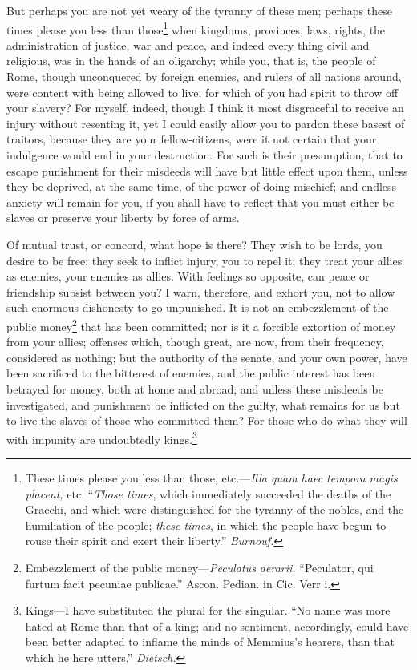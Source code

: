 But perhaps you are not yet weary of the tyranny of these men;
perhaps these times please you less than those\footnote{These times please you less than those, etc.—\emph{Illa quam
haec tempora magis placent,} etc. ``\emph{Those times}, which immediately
succeeded the deaths of the Gracchi, and which were distinguished for
the tyranny of the nobles, and the humiliation of the people; \emph{these
times}, in which the people have begun to rouse their spirit and exert
their liberty.'' \emph{Burnouf.}} when kingdoms,
provinces, laws, rights, the administration of justice, war and peace,
and indeed every thing civil and religious, was in the hands of an
oligarchy; while you, that is, the people of Rome, though unconquered
by foreign enemies, and rulers of all nations around, were content
with being allowed to live; for which of you had spirit to throw off
your slavery? For myself, indeed, though I think it most disgraceful
to receive an injury without resenting it, yet I could easily allow
you to pardon these basest of traitors, because they are your
fellow-citizens, were it not certain that your indulgence would end in
your destruction. For such is their presumption, that to escape
punishment for their misdeeds will have but little effect upon them,
unless they be deprived, at the same time, of the power of doing
mischief; and endless anxiety will remain for you, if you shall have
to reflect that you must either be slaves or preserve your liberty by
force of arms.

Of mutual trust, or concord, what hope is there? They wish to be
lords, you desire to be free; they seek to inflict injury, you to
repel it; they treat your allies as enemies, your enemies as allies.
With feelings so opposite, can peace or friendship subsist between
you? I warn, therefore, and exhort you, not to allow such enormous
dishonesty to go unpunished. It is not an embezzlement of the public
money\footnote{Embezzlement of the public money—\emph{Peculatus aerarii.} ``Peculator,
qui furtum facit pecuniae publicae.'' Ascon. Pedian. in Cic. Verr i.} that has been committed; nor is it a forcible extortion of
money from your allies; offenses which, though great, are now, from
their frequency, considered as nothing; but the authority of the
senate, and your own power, have been sacrificed to the bitterest of
enemies, and the public interest has been betrayed for money, both at
home and abroad; and unless these misdeeds be investigated, and
punishment be inflicted on the guilty, what remains for us but to live
the slaves of those who committed them? For those who do what they
will with impunity are undoubtedly kings.\footnote{Kings—I have substituted the plural for the singular. ``No
name was more hated at Rome than that of a king; and no sentiment,
accordingly, could have been better adapted to inflame the minds of
Memmius's hearers, than that which he here utters.'' \emph{Dietsch.}}

